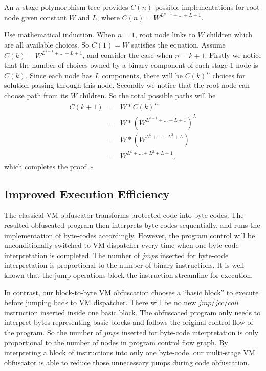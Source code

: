 \documentclass{../style/llncs}                   %
\renewenvironment{proof}{\par\noindent{\em Proof.}}{\hspace*{\fill}$\square$\par}
\begin{document}
\begin{theorem} \label{theorem_poly}
An  $n$-stage polymorphism tree provides $C(n)$ possible implementations
for root node given constant $W$ and $L$, where $C(n) = W^{L^{n-1} +...+L+1}$.
\end{theorem}
\begin{proof}
Use mathematical induction. When $n=1$, root node links to $W$ children which are
all available choices. So $C(1)= W$ satisfies the equation.
Assume $C(k) = W^{L^{k-1} +...+L+1}$, and consider the case when $n = k +1$.
Firstly we notice that the number of choices owned by a binary component of each stage-1 node is
$C(k)$. Since each node has $L$ components, there will be $C(k)^L$ choices for solution
passing through this node. Secondly we notice that the root node can choose path from its
$W$ children. So the total possible paths will be
\begin{eqnarray*}
C(k+1) &=& W* C(k)^L   \\
       &=& W*(W^{L^{k-1} +...+L+1})^L  \\
       &=& W*( W^{L^k+...+L^2+L} )  \\
       &=& W^{L^k+...+L^2+L+1},
\end{eqnarray*}
which completes the proof.
\end{proof}



\subsection{Improved Execution Efficiency}

The classical VM obfuscator transforms protected code into
byte-codes. The resulted obfuscated program then interprets byte-codes
sequentially, and runs the implementation of byte-codes accordingly.
However, the program control will be unconditionally switched to VM dispatcher
every time when one byte-code interpretation is completed.
The number of $jmp$s inserted for byte-code interpretation is proportional
to the number of binary instructions.
It is well known that the jump operations block the instruction streamline for execution.


In contrast, our block-to-byte VM obfuscation chooses a ``basic block'' to execute
before jumping back to VM dispatcher. There will be no new $jmp/jcc/call$ instruction
inserted inside one basic block. The obfuscated program only needs to interpret
bytes representing basic blocks and follows the original control flow of the
program. So the number of $jmp$s inserted for byte-code interpretation
is only proportional to the number of nodes in program control flow graph.
By interpreting a block of instructions into only one byte-code,
our multi-stage VM obfuscator is able to reduce those unnecessary jumps during
code obfuscation.
\end{document}
